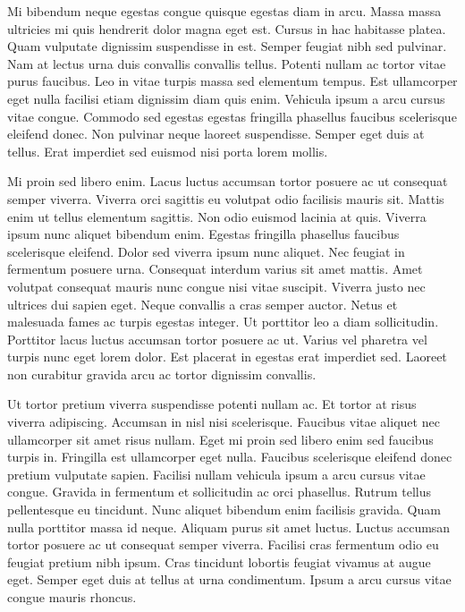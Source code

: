 \documentclass[11pt,a4paper]{article}
\begin{document}
Mi bibendum neque egestas congue quisque egestas diam in arcu. Massa massa ultricies mi quis hendrerit dolor magna eget est. Cursus in hac habitasse platea. Quam vulputate dignissim suspendisse in est. Semper feugiat nibh sed pulvinar. Nam at lectus urna duis convallis convallis tellus. Potenti nullam ac tortor vitae purus faucibus. Leo in vitae turpis massa sed elementum tempus. Est ullamcorper eget nulla facilisi etiam dignissim diam quis enim. Vehicula ipsum a arcu cursus vitae congue. Commodo sed egestas egestas fringilla phasellus faucibus scelerisque eleifend donec. Non pulvinar neque laoreet suspendisse. Semper eget duis at tellus. Erat imperdiet sed euismod nisi porta lorem mollis.

Mi proin sed libero enim. Lacus luctus accumsan tortor posuere ac ut consequat semper viverra. Viverra orci sagittis eu volutpat odio facilisis mauris sit. Mattis enim ut tellus elementum sagittis. Non odio euismod lacinia at quis. Viverra ipsum nunc aliquet bibendum enim. Egestas fringilla phasellus faucibus scelerisque eleifend. Dolor sed viverra ipsum nunc aliquet. Nec feugiat in fermentum posuere urna. Consequat interdum varius sit amet mattis. Amet volutpat consequat mauris nunc congue nisi vitae suscipit. Viverra justo nec ultrices dui sapien eget. Neque convallis a cras semper auctor. Netus et malesuada fames ac turpis egestas integer. Ut porttitor leo a diam sollicitudin. Porttitor lacus luctus accumsan tortor posuere ac ut. Varius vel pharetra vel turpis nunc eget lorem dolor. Est placerat in egestas erat imperdiet sed. Laoreet non curabitur gravida arcu ac tortor dignissim convallis.

Ut tortor pretium viverra suspendisse potenti nullam ac. Et tortor at risus viverra adipiscing. Accumsan in nisl nisi scelerisque. Faucibus vitae aliquet nec ullamcorper sit amet risus nullam. Eget mi proin sed libero enim sed faucibus turpis in. Fringilla est ullamcorper eget nulla. Faucibus scelerisque eleifend donec pretium vulputate sapien. Facilisi nullam vehicula ipsum a arcu cursus vitae congue. Gravida in fermentum et sollicitudin ac orci phasellus. Rutrum tellus pellentesque eu tincidunt. Nunc aliquet bibendum enim facilisis gravida. Quam nulla porttitor massa id neque. Aliquam purus sit amet luctus. Luctus accumsan tortor posuere ac ut consequat semper viverra. Facilisi cras fermentum odio eu feugiat pretium nibh ipsum. Cras tincidunt lobortis feugiat vivamus at augue eget. Semper eget duis at tellus at urna condimentum. Ipsum a arcu cursus vitae congue mauris rhoncus.
\end{document}
